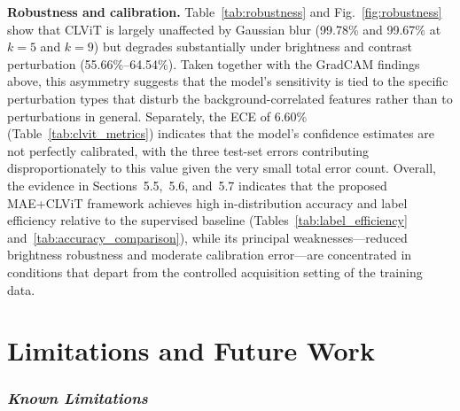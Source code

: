 \documentclass[conference]{IEEEtran}
\begin{document}
\textbf{Robustness and calibration.}
Table~\ref{tab:robustness} and Fig.~\ref{fig:robustness} show that CLViT is largely unaffected by Gaussian blur (99.78\% and 99.67\% at $k=5$ and $k=9$) but degrades substantially under brightness and contrast perturbation (55.66\%--64.54\%). Taken together with the GradCAM findings above, this asymmetry suggests that the model's sensitivity is tied to the specific perturbation types that disturb the background-correlated features rather than to perturbations in general. Separately, the ECE of 6.60\% (Table~\ref{tab:clvit_metrics}) indicates that the model's confidence estimates are not perfectly calibrated, with the three test-set errors contributing disproportionately to this value given the very small total error count. Overall, the evidence in Sections~5.5,~5.6, and~5.7 indicates that the proposed MAE+CLViT framework achieves high in-distribution accuracy and label efficiency relative to the supervised baseline (Tables~\ref{tab:label_efficiency} and~\ref{tab:accuracy_comparison}), while its principal weaknesses---reduced brightness robustness and moderate calibration error---are concentrated in conditions that depart from the controlled acquisition setting of the training data.





\section{Limitations and Future Work}

\subsubsection{\textit{Known Limitations}}
\end{document}
